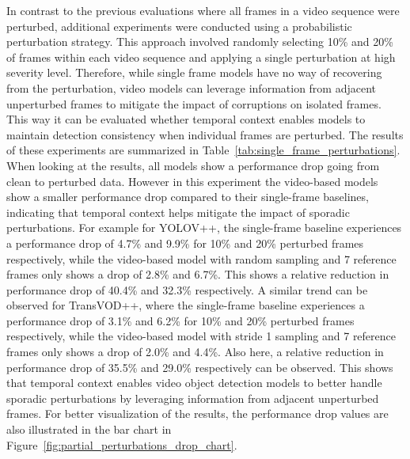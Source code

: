 \documentclass[final,twoside]{vutinfth}
\begin{document}
\endgroup
In contrast to the previous evaluations where all frames in a video sequence were perturbed, additional experiments were conducted using a probabilistic perturbation strategy.
This approach involved randomly selecting 10\% and 20\% of frames within each video sequence and applying a single perturbation at high severity level.
Therefore, while single frame models have no way of recovering from the perturbation, video models can leverage information from adjacent unperturbed frames to mitigate the impact of corruptions on isolated frames.
This way it can be evaluated whether temporal context enables models to maintain detection consistency when individual frames are perturbed.
The results of these experiments are summarized in Table~\ref{tab:single_frame_perturbations}.
When looking at the results, all models show a performance drop going from clean to perturbed data.
However in this experiment the video-based models show a smaller performance drop compared to their single-frame baselines, indicating that temporal context helps mitigate the impact of sporadic perturbations.
For example for YOLOV++, the single-frame baseline experiences a performance drop of 4.7\% and 9.9\% for 10\% and 20\% perturbed frames respectively, while the video-based model with random sampling and 7 reference frames only shows a drop of 2.8\% and 6.7\%.
This shows a relative reduction in performance drop of 40.4\% and 32.3\% respectively.
A similar trend can be observed for TransVOD++, where the single-frame baseline experiences a performance drop of 3.1\% and 6.2\% for 10\% and 20\% perturbed frames respectively, while the video-based model with stride 1 sampling and 7 reference frames only shows a drop of 2.0\% and 4.4\%.
Also here, a relative reduction in performance drop of 35.5\% and 29.0\% respectively can be observed.
This shows that temporal context enables video object detection models to better handle sporadic perturbations by leveraging information from adjacent unperturbed frames.
For better visualization of the results, the performance drop values are also illustrated in the bar chart in Figure~\ref{fig:partial_perturbations_drop_chart}.
\end{document}
